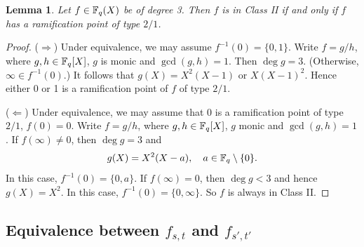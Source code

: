 \documentclass{amsart}
\newtheorem{lem}[thm]{Lemma}
\numberwithin{equation}{section}
\theoremstyle{definition}
\newcommand{\f}{\Bbb F}
\begin{document}
\begin{lem}\label{lem:2/1}
Let $f\in\f_q(X)$ be of degree 3. Then $f$ is in Class II if and only if $f$ has a ramification point of type $2/1$.
\end{lem}

\begin{proof}
($\Rightarrow$) Under equivalence, we may assume $f^{-1}(0)=\{0,1\}$. Write $f=g/h$, where $g,h\in\f_q[X]$, $g$ is monic and $\gcd(g,h)=1$. Then $\deg g=3$. (Otherwise, $\infty\in f^{-1}(0)$.) It follows that $g(X)=X^2(X-1)$ or $X(X-1)^2$. Hence either 0 or 1 is a ramification point of $f$ of type $2/1$.

\medskip
($\Leftarrow$) Under equivalence, we may assume that 0 is a ramification point of type $2/1$, $f(0)=0$. Write $f=g/h$, where $g,h\in\f_q[X]$, $g$ monic and $\gcd(g,h)=1$. If $f(\infty)\ne 0$, then $\deg g=3$ and 
\[
g(X)=X^2(X-a),\quad a\in\f_q\setminus\{0\}.
\]
In this case, $f^{-1}(0)=\{0,a\}$. If $f(\infty)=0$, then $\deg g<3$ and hence $g(X)=X^2$. In this case, $f^{-1}(0)=\{0,\infty\}$. So $f$ is always in Class II.
\end{proof}


\subsection{Equivalence between $f_{s,t}$ and $f_{s',t'}$}\
\end{document}
